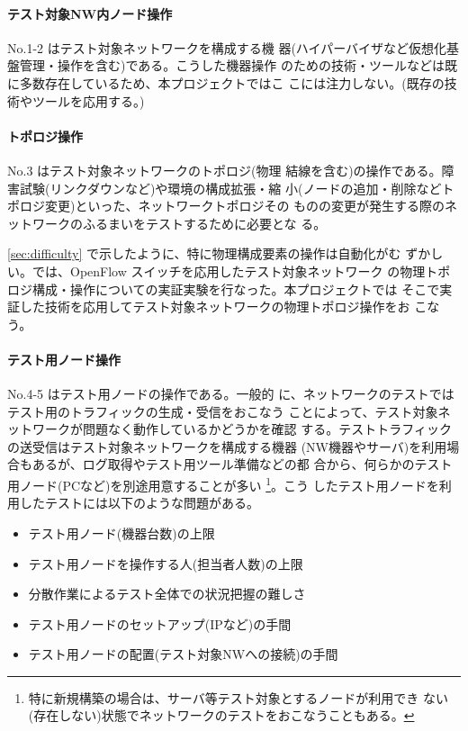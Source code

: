     \paragraph{テスト対象NW内ノード操作}
 No.1-2 はテスト対象ネットワークを構成する機
器(ハイパーバイザなど仮想化基盤管理・操作を含む)である。こうした機器操作
のための技術・ツールなどは既に多数存在しているため、本プロジェクトではこ
こには注力しない。(既存の技術やツールを応用する。)

    \paragraph{トポロジ操作}
 No.3 はテスト対象ネットワークのトポロジ(物理
結線を含む)の操作である。障害試験(リンクダウンなど)や環境の構成拡張・縮
小(ノードの追加・削除などトポロジ変更)といった、ネットワークトポロジその
ものの変更が発生する際のネットワークのふるまいをテストするために必要とな
る。

\ref{sec:difficulty} で示したように、特に物理構成要素の操作は自動化がむ
ずかしい。\lopjc では、OpenFlow スイッチを応用したテスト対象ネットワーク
の物理トポロジ構成・操作についての実証実験を行なった。本プロジェクトでは
そこで実証した技術を応用してテスト対象ネットワークの物理トポロジ操作をお
こなう。

    \paragraph{テスト用ノード操作}
 No.4-5 はテスト用ノードの操作である。一般的
に、ネットワークのテストではテスト用のトラフィックの生成・受信をおこなう
ことによって、テスト対象ネットワークが問題なく動作しているかどうかを確認
する。テストトラフィックの送受信はテスト対象ネットワークを構成する機器
(NW機器やサーバ)を利用場合もあるが、ログ取得やテスト用ツール準備などの都
合から、何らかのテスト用ノード(PCなど)を別途用意することが多い
\footnote{特に新規構築の場合は、サーバ等テスト対象とするノードが利用でき
ない(存在しない)状態でネットワークのテストをおこなうこともある。}。こう
したテスト用ノードを利用したテストには以下のような問題がある。
\begin{itemize}
 \item テスト用ノード(機器台数)の上限
 \item テスト用ノードを操作する人(担当者人数)の上限
 \item 分散作業によるテスト全体での状況把握の難しさ
 \item テスト用ノードのセットアップ(IPなど)の手間
 \item テスト用ノードの配置(テスト対象NWへの接続)の手間
\end{itemize}

